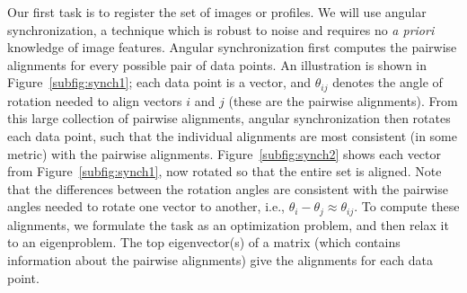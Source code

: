 \documentclass{pnastwo}
\begin{document}
\begin{article}
Our first task is to register the set of images or profiles.
%
%
%
We will use angular synchronization\cite{singer2011angular}, a technique which is robust to noise and requires no {\em a priori} knowledge of image features.
%
Angular synchronization first computes the pairwise alignments %
for every possible pair of data points. %
%
An illustration is shown in Figure~\ref{subfig:synch1};
each data point is a vector, and $\theta_{ij}$ denotes the angle of rotation needed to align vectors $i$ and $j$ (these are the pairwise alignments).
%
From this large collection of pairwise alignments, angular synchronization then rotates each data point, such that the individual alignments are most consistent (in some metric) with the pairwise alignments.
%
Figure~\ref{subfig:synch2} shows each vector from Figure~\ref{subfig:synch1}, now rotated so that the entire set is aligned.
%
Note that the differences between the rotation angles are consistent with the pairwise angles needed to rotate one vector to another, i.e., $\theta_i - \theta_j \approx \theta_{ij}$.
%
To compute these alignments, we formulate the task as an optimization problem, and then relax it to an eigenproblem.
%
The top eigenvector(s) of a matrix (which contains information about the pairwise alignments) give the alignments for each data point.
%


\end{article}
\end{document}
